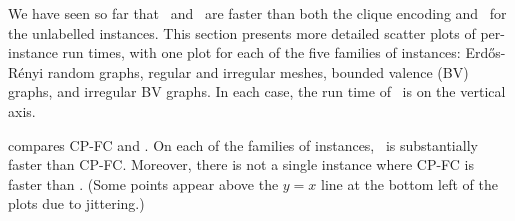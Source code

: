 We have seen so far that \McSplit\ and \McSplitDown\ are
faster than both the clique encoding and \kDown\ for the unlabelled instances.  This section
presents more detailed scatter plots of per-instance run times, with one plot for each of the five
families of instances: Erd\H{o}s-Rényi random graphs, regular and irregular meshes, bounded
valence (BV) graphs, and irregular BV graphs.  In each case, the run time of \McSplitDown\
is on the vertical axis.

 compares CP-FC and \McSplitDown.  On each of the
families of instances, \McSplitDown\ is substantially faster than CP-FC.  Moreover, there is not a
single instance where CP-FC is faster than \McSplitDown.  (Some points appear above the $y=x$ line
at the bottom left of the plots due to jittering.)

